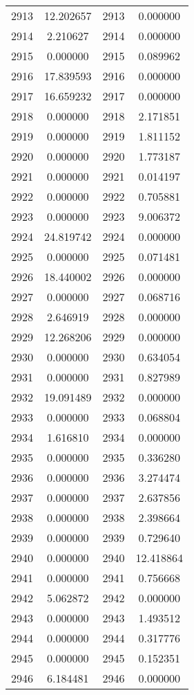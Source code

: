 \documentclass[12pt]{article}
\begin{document}
\begin{longtable}{@{}cccc@{}}
2913 & 12.202657 & 2913 & 0.000000 \\
2914 & 2.210627 & 2914 & 0.000000 \\
2915 & 0.000000 & 2915 & 0.089962 \\
2916 & 17.839593 & 2916 & 0.000000 \\
2917 & 16.659232 & 2917 & 0.000000 \\
2918 & 0.000000 & 2918 & 2.171851 \\
2919 & 0.000000 & 2919 & 1.811152 \\
2920 & 0.000000 & 2920 & 1.773187 \\
2921 & 0.000000 & 2921 & 0.014197 \\
2922 & 0.000000 & 2922 & 0.705881 \\
2923 & 0.000000 & 2923 & 9.006372 \\
2924 & 24.819742 & 2924 & 0.000000 \\
2925 & 0.000000 & 2925 & 0.071481 \\
2926 & 18.440002 & 2926 & 0.000000 \\
2927 & 0.000000 & 2927 & 0.068716 \\
2928 & 2.646919 & 2928 & 0.000000 \\
2929 & 12.268206 & 2929 & 0.000000 \\
2930 & 0.000000 & 2930 & 0.634054 \\
2931 & 0.000000 & 2931 & 0.827989 \\
2932 & 19.091489 & 2932 & 0.000000 \\
2933 & 0.000000 & 2933 & 0.068804 \\
2934 & 1.616810 & 2934 & 0.000000 \\
2935 & 0.000000 & 2935 & 0.336280 \\
2936 & 0.000000 & 2936 & 3.274474 \\
2937 & 0.000000 & 2937 & 2.637856 \\
2938 & 0.000000 & 2938 & 2.398664 \\
2939 & 0.000000 & 2939 & 0.729640 \\
2940 & 0.000000 & 2940 & 12.418864 \\
2941 & 0.000000 & 2941 & 0.756668 \\
2942 & 5.062872 & 2942 & 0.000000 \\
2943 & 0.000000 & 2943 & 1.493512 \\
2944 & 0.000000 & 2944 & 0.317776 \\
2945 & 0.000000 & 2945 & 0.152351 \\
2946 & 6.184481 & 2946 & 0.000000 \\

\end{longtable}
\end{document}

